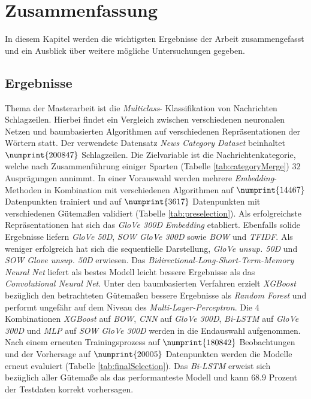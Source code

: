 \documentclass[a4paper,11pt]{article}
\begin{document}
\section{Zusammenfassung}\label{kap:5}

In diesem Kapitel werden die wichtigsten Ergebnisse der Arbeit zusammengefasst und ein Ausblick über weitere mögliche Untersuchungen gegeben.

\subsection{Ergebnisse}

Thema der Masterarbeit ist die \textit{Multiclass}- Klassifikation von Nachrichten Schlagzeilen. Hierbei findet ein Vergleich zwischen verschiedenen neuronalen Netzen und baumbasierten Algorithmen auf verschiedenen Repräsentationen der Wörtern statt. Der verwendete Datensatz \textit{News Category Dataset} beinhaltet $\numprint{200847}$ Schlagzeilen. Die Zielvariable ist die Nachrichtenkategorie, welche nach Zusammenführung einiger Sparten (Tabelle \ref{tab:categoryMerge}) $32$ Ausprägungen annimmt. In einer Vorauswahl werden mehrere \textit{Embedding}-Methoden in Kombination mit verschiedenen Algorithmen auf $\numprint{14467}$ Datenpunkten trainiert und auf $\numprint{3617}$ Datenpunkten mit verschiedenen Gütemaßen validiert (Tabelle \ref{tab:preselection}). Als erfolgreichste Repräsentationen hat sich das \textit{GloVe 300D} \textit{Embedding} etabliert. Ebenfalls solide Ergebnisse liefern \textit{GloVe 50D}, \textit{SOW GloVe 300D} sowie \textit{BOW} und \textit{TFIDF}. Als weniger erfolgreich hat sich die sequentielle Darstellung, \textit{GloVe unsup. 50D} und \textit{SOW Glove unsup. 50D} erwiesen. Das \textit{Bidirectional-Long-Short-Term-Memory Neural Net} liefert als bestes Modell leicht bessere Ergebnisse als das \textit{Convolutional Neural Net}. Unter den baumbasierten Verfahren erzielt \textit{XGBoost} bezüglich den betrachteten Gütemaßen bessere Ergebnisse als \textit{Random Forest} und performt ungefähr auf dem Niveau des \textit{Multi-Layer-Perceptron}. Die $4$ Kombinationen \textit{XGBoost} auf \textit{BOW}, \textit{CNN} auf \textit{GloVe 300D}, \textit{Bi-LSTM} auf \textit{GloVe 300D} und \textit{MLP} auf \textit{SOW GloVe 300D} werden in die Endauswahl aufgenommen. \\
Nach einem erneuten Trainingsprozess auf $\numprint{180842}$ Beobachtungen und der Vorhersage auf $\numprint{20005}$ Datenpunkten werden die Modelle erneut evaluiert (Tabelle \ref{tab:finalSelection}). Das \textit{Bi-LSTM} erweist sich bezüglich aller Gütemaße als das performanteste Modell und kann $68.9$ Prozent der Testdaten korrekt vorhersagen. \\
\end{document}
